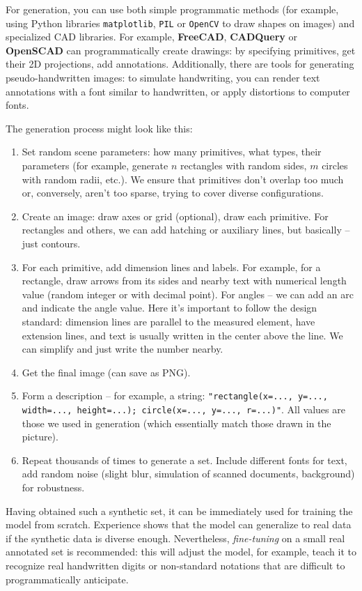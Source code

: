\documentclass{article}
\begin{document}
For generation, you can use both simple programmatic methods (for example, using Python libraries \texttt{matplotlib}, \texttt{PIL} or \texttt{OpenCV} to draw shapes on images) and specialized CAD libraries. For example, \textbf{FreeCAD}, \textbf{CADQuery} or \textbf{OpenSCAD} can programmatically create drawings: by specifying primitives, get their 2D projections, add annotations. Additionally, there are tools for generating pseudo-handwritten images: to simulate handwriting, you can render text annotations with a font similar to handwritten, or apply distortions to computer fonts.

The generation process might look like this:
\begin{enumerate}
\item Set random scene parameters: how many primitives, what types, their parameters (for example, generate $n$ rectangles with random sides, $m$ circles with random radii, etc.). We ensure that primitives don't overlap too much or, conversely, aren't too sparse, trying to cover diverse configurations.
\item Create an image: draw axes or grid (optional), draw each primitive. For rectangles and others, we can add hatching or auxiliary lines, but basically – just contours.
\item For each primitive, add dimension lines and labels. For example, for a rectangle, draw arrows from its sides and nearby text with numerical length value (random integer or with decimal point). For angles – we can add an arc and indicate the angle value. Here it's important to follow the design standard: dimension lines are parallel to the measured element, have extension lines, and text is usually written in the center above the line. We can simplify and just write the number nearby.
\item Get the final image (can save as PNG).
\item Form a description – for example, a string: \texttt{"rectangle(x=..., y=..., width=..., height=...); circle(x=..., y=..., r=...)"}. All values are those we used in generation (which essentially match those drawn in the picture).
\item Repeat thousands of times to generate a set. Include different fonts for text, add random noise (slight blur, simulation of scanned documents, background) for robustness.
\end{enumerate}

Having obtained such a synthetic set, it can be immediately used for training the model from scratch. Experience shows that the model can generalize to real data if the synthetic data is diverse enough. Nevertheless, \textit{fine-tuning} on a small real annotated set is recommended: this will adjust the model, for example, teach it to recognize real handwritten digits or non-standard notations that are difficult to programmatically anticipate.
\end{document}
